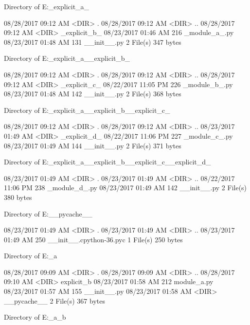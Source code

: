  Directory of E:\Python\apeman\mockup\simple\explicit\_explicit_a_

08/28/2017  09:12 AM    <DIR>          .
08/28/2017  09:12 AM    <DIR>          ..
08/28/2017  09:12 AM    <DIR>          _explicit_b_
08/23/2017  01:46 AM               216 _module_a_.py
08/23/2017  01:48 AM               131 __init__.py
               2 File(s)            347 bytes

 Directory of E:\Python\apeman\mockup\simple\explicit\_explicit_a_\_explicit_b_

08/28/2017  09:12 AM    <DIR>          .
08/28/2017  09:12 AM    <DIR>          ..
08/28/2017  09:12 AM    <DIR>          _explicit_c_
08/22/2017  11:05 PM               226 _module_b_.py
08/23/2017  01:48 AM               142 __init__.py
               2 File(s)            368 bytes

 Directory of E:\Python\apeman\mockup\simple\explicit\_explicit_a_\_explicit_b_\_explicit_c_

08/28/2017  09:12 AM    <DIR>          .
08/28/2017  09:12 AM    <DIR>          ..
08/23/2017  01:49 AM    <DIR>          _explicit_d_
08/22/2017  11:06 PM               227 _module_c_.py
08/23/2017  01:49 AM               144 __init__.py
               2 File(s)            371 bytes

 Directory of E:\Python\apeman\mockup\simple\explicit\_explicit_a_\_explicit_b_\_explicit_c_\_explicit_d_

08/23/2017  01:49 AM    <DIR>          .
08/23/2017  01:49 AM    <DIR>          ..
08/22/2017  11:06 PM               238 _module_d_.py
08/23/2017  01:49 AM               142 __init__.py
               2 File(s)            380 bytes

 Directory of E:\Python\apeman\mockup\simple\explicit\__pycache__

08/23/2017  01:49 AM    <DIR>          .
08/23/2017  01:49 AM    <DIR>          ..
08/23/2017  01:49 AM               250 __init__.cpython-36.pyc
               1 File(s)            250 bytes

 Directory of E:\Python\apeman\mockup\simple\explicit_a

08/28/2017  09:09 AM    <DIR>          .
08/28/2017  09:09 AM    <DIR>          ..
08/28/2017  09:10 AM    <DIR>          explicit_b
08/23/2017  01:58 AM               212 module_a.py
08/23/2017  01:57 AM               155 __init__.py
08/23/2017  01:58 AM    <DIR>          __pycache__
               2 File(s)            367 bytes

 Directory of E:\Python\apeman\mockup\simple\explicit_a\explicit_b


